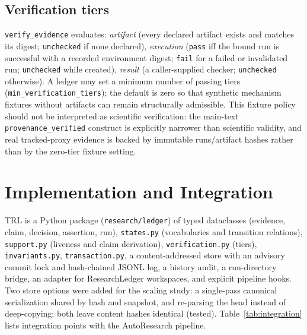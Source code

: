 \documentclass[journal]{IEEEtran}
\begin{document}
\subsection{Verification tiers}
\texttt{verify\_evidence} evaluates: \emph{artifact} (every declared artifact exists and matches its digest; \texttt{unchecked} if none declared), \emph{execution} (\texttt{pass} iff the bound run is successful with a recorded environment digest; \texttt{fail} for a failed or invalidated run; \texttt{unchecked} while created), \emph{result} (a caller-supplied checker; \texttt{unchecked} otherwise). A ledger may set a minimum number of passing tiers (\texttt{min\_verification\_tiers}); the default is zero so that synthetic mechanism fixtures without artifacts can remain structurally admissible. This fixture policy should not be interpreted as scientific verification: the main-text \texttt{provenance\_verified} construct is explicitly narrower than scientific validity, and real tracked-proxy evidence is backed by immutable runs/artifact hashes rather than by the zero-tier fixture setting.

\section{Implementation and Integration}
TRL is a Python package (\texttt{research/ledger}) of typed dataclasses (evidence, claim, decision, assertion, run), \texttt{states.py} (vocabularies and transition relations), \texttt{support.py} (liveness and claim derivation), \texttt{verification.py} (tiers), \texttt{invariants.py}, \texttt{transaction.py}, a content-addressed store with an advisory commit lock and hash-chained JSONL log, a history audit, a run-directory bridge, an adapter for ResearchLedger workspaces, and explicit pipeline hooks. Two store options were added for the scaling study: a single-pass canonical serialization shared by hash and snapshot, and re-parsing the head instead of deep-copying; both leave content hashes identical (tested). Table~\ref{tab:integration} lists integration points with the AutoResearch pipeline.
\end{document}
